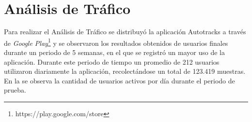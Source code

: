 
%
%

\section{Análisis de Tráfico}

Para realizar el Análisis de Tráfico se distribuyó la aplicación Autotracks a través de \emph{Google Play}\footnote{https://play.google.com/store} y se observaron los resultados obtenidos de usuarios finales durante un periodo de 5 semanas, en el que se registró un mayor uso de la aplicación. Durante este periodo de tiempo un promedio de 212 usuarios utilizaron diariamente la aplicación, recolectándose un total de 123.419 muestras. En la  se observa la cantidad de usuarios activos por día durante el periodo de prueba.

